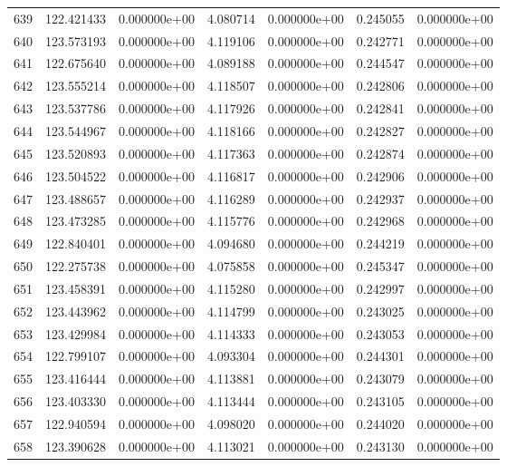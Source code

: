 \begin{tabular}{rrrrrrr}
 639 & 122.421433 &  0.000000e+00 &  4.080714 &  0.000000e+00 &   0.245055 &  0.000000e+00 \\
 640 & 123.573193 &  0.000000e+00 &  4.119106 &  0.000000e+00 &   0.242771 &  0.000000e+00 \\
 641 & 122.675640 &  0.000000e+00 &  4.089188 &  0.000000e+00 &   0.244547 &  0.000000e+00 \\
 642 & 123.555214 &  0.000000e+00 &  4.118507 &  0.000000e+00 &   0.242806 &  0.000000e+00 \\
 643 & 123.537786 &  0.000000e+00 &  4.117926 &  0.000000e+00 &   0.242841 &  0.000000e+00 \\
 644 & 123.544967 &  0.000000e+00 &  4.118166 &  0.000000e+00 &   0.242827 &  0.000000e+00 \\
 645 & 123.520893 &  0.000000e+00 &  4.117363 &  0.000000e+00 &   0.242874 &  0.000000e+00 \\
 646 & 123.504522 &  0.000000e+00 &  4.116817 &  0.000000e+00 &   0.242906 &  0.000000e+00 \\
 647 & 123.488657 &  0.000000e+00 &  4.116289 &  0.000000e+00 &   0.242937 &  0.000000e+00 \\
 648 & 123.473285 &  0.000000e+00 &  4.115776 &  0.000000e+00 &   0.242968 &  0.000000e+00 \\
 649 & 122.840401 &  0.000000e+00 &  4.094680 &  0.000000e+00 &   0.244219 &  0.000000e+00 \\
 650 & 122.275738 &  0.000000e+00 &  4.075858 &  0.000000e+00 &   0.245347 &  0.000000e+00 \\
 651 & 123.458391 &  0.000000e+00 &  4.115280 &  0.000000e+00 &   0.242997 &  0.000000e+00 \\
 652 & 123.443962 &  0.000000e+00 &  4.114799 &  0.000000e+00 &   0.243025 &  0.000000e+00 \\
 653 & 123.429984 &  0.000000e+00 &  4.114333 &  0.000000e+00 &   0.243053 &  0.000000e+00 \\
 654 & 122.799107 &  0.000000e+00 &  4.093304 &  0.000000e+00 &   0.244301 &  0.000000e+00 \\
 655 & 123.416444 &  0.000000e+00 &  4.113881 &  0.000000e+00 &   0.243079 &  0.000000e+00 \\
 656 & 123.403330 &  0.000000e+00 &  4.113444 &  0.000000e+00 &   0.243105 &  0.000000e+00 \\
 657 & 122.940594 &  0.000000e+00 &  4.098020 &  0.000000e+00 &   0.244020 &  0.000000e+00 \\
 658 & 123.390628 &  0.000000e+00 &  4.113021 &  0.000000e+00 &   0.243130 &  0.000000e+00 \\

\end{tabular}
